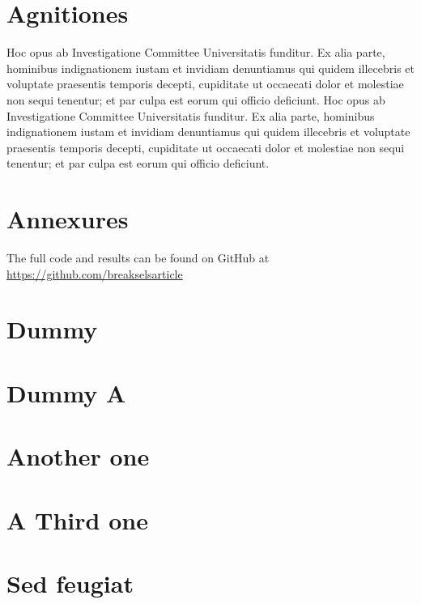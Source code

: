 \documentclass[preprint,3p,times,twocolumn]{elsarticle}  %
\begin{document}
\section{Agnitiones}\label{sec:acknowledgment}
\ifpeerreview
Hoc opus ab Investigatione Committee Universitatis funditur.
Ex alia parte, hominibus indignationem iustam et invidiam denuntiamus
qui quidem illecebris et voluptate praesentis temporis decepti,
cupiditate ut occaecati dolor et molestiae non
sequi tenentur; et par culpa est eorum qui officio deficiunt.
\else
Hoc opus ab Investigatione Committee Universitatis funditur.
Ex alia parte, hominibus indignationem iustam et invidiam denuntiamus
qui quidem illecebris et voluptate praesentis temporis decepti,
cupiditate ut occaecati dolor et molestiae non
sequi tenentur; et par culpa est eorum qui officio deficiunt.
\fi

\section{Annexures}\label{section:annexures}
The full code and results can be found on GitHub at
{\small \url{https://github.com/breakselsarticle}}



\appendix
\section{Dummy}\label{section:A}\label{sec:A}\label{section:B}\label{sec:B}\label{section:C}\label{sec:C}
\label{table:A}\label{table:B}
\section{Dummy A}\label{section:A}\label{sec:A}
\setcounter{table}{0}

\section{Another one}\label{section:B}\label{sec:B}
\setcounter{table}{0}

\section{A Third one}\label{section:C}\label{sec:C}
\setcounter{figure}{0}
\label{fig:A13}

\section{Sed feugiat}
\end{document}
